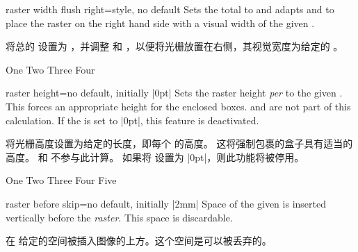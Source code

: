\begin{docTcbKey}[][doc new=2018-11-30]{raster width flush right}{=}{style, no default}
Sets the total  to  and adapts
 and  to
place the raster on the right hand side
with a visual width of the given .

将总的  设置为 ，并调整 和 ，以便将光栅放置在右侧，其视觉宽度为给定的 。
\begin{dispExample}
\begin{tcbitemize}[raster width flush right=\linewidth/2,
size=small,colframe=red!50!black,colback=red!10!white]
\tcbitem One
\tcbitem Two
\tcbitem Three
\tcbitem Four
\end{tcbitemize}
\end{dispExample}
\end{docTcbKey}


\begin{docTcbKey}[][doc new=2014-11-10]{raster height}{=}{no default, initially |0pt|}
Sets the raster height \emph{per}  to the given .
This forces an appropriate height for the enclosed boxes.
 and 
are not part of this calculation.
If the  is set to |0pt|, this feature is deactivated.

将光栅高度设置为给定的长度，即每个  的高度。 这将强制包裹的盒子具有适当的高度。  和  不参与此计算。 如果将  设置为 |0pt|，则此功能将被停用。
\begin{dispExample}
\begin{tcbitemize}[raster height=4cm, raster rows=2,
size=small,colframe=red!50!black,colback=red!10!white]
\tcbitem One
\tcbitem Two
\tcbitem[enhanced,
finish={\draw[blue,very thick,<->] (frame.south)
    -- node[right,pos=.75]{4cm} +(0,4); }]
Three
\tcbitem Four
\tcbitem Five
\end{tcbitemize}
\end{dispExample}
\end{docTcbKey}


\begin{docTcbKey}[][doc new and updated={2014-11-10}{2014-12-16}]{raster before skip}{=}{no default, initially |2mm|}
Space of the given  is inserted vertically before the \emph{raster}.
This space is discardable.

在  给定的空间被插入图像的上方。这个空间是可以被丢弃的。
\end{docTcbKey}

